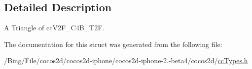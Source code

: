 \subsection{Detailed Description}
A Triangle of cc\-V2\-F\-\_\-\-C4\-B\-\_\-\-T2\-F. 

The documentation for this struct was generated from the following file\-:\begin{DoxyCompactItemize}
\item 
/\-Bing/\-File/cocos2d/cocos2d-\/iphone/cocos2d-\/iphone-\/2.-\/beta4/cocos2d/\hyperlink{cc_types_8h}{cc\-Types.\-h}\end{DoxyCompactItemize}
